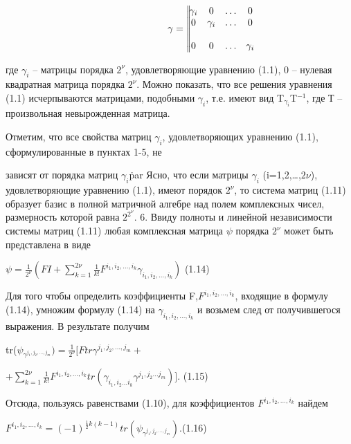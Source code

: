 \documentclass{article}
\begin{document}
{\begin{center}
$$
\gamma=\begin{vmatrix}
\gamma_i & 0 &\ldots & 0\\
0 & \gamma_i &\ldots & 0\\
\hdotsfor{5}\\
0 & 0 &\ldots &\gamma_i
\end{vmatrix}
$$
\end{center}\par
где $\gamma_i$ -- матрицы порядка $2^{\nu}$, удовлетворяющие уравнению (1.1), 0 -- нулевая квадратная матрица порядка $2^{\nu}$. Можно показать, что все решения уравнения (1.1) исчерпываются матрицами, подобными $\gamma_i$, т.е. имеют вид T$_{\gamma_i}$T$^{-1}$, где Т -- произвольная невырожденная матрица.\par
Отметим, что все свойства матриц $\gamma_i$, удовлетворяющих уравнению (1.1), сформулированные в пунктах 1-5, не\par
зависят от порядка матриц $\gamma_i$\.par
Ясно, что если матрицы $\gamma_i$ (i=1,2,\dots ,$2\nu$), удовлетворяющие уравнению (1.1), имеют порядок $2^\nu$, то система матриц (1.11) образует базис в полной матричной алгебре над полем комплексных чисел, размерность которой равна $2^{2^\nu}$.
6. Ввиду полноты и линейной независимости системы матриц (1.11) любая комплексная матрица $\psi$ порядка $2^\nu$ может быть представлена в виде
\begin{center}
$\psi = \frac{1}{2^\nu}(FI+\sum_{k=1}^{2\nu}\frac{1}{k!}F^{i_1,i_2,\dots,i_k}\gamma_{i_1,i_2,\dots,i_k})$   (1.14)\par
\end{center}
Для того чтобы определить коэффициенты F,$F^{i_1,i_2,\dots,i_k}$, входящие в формулу (1.14), умножим формулу (1.14) на $\gamma_{i_1,i_2,\dots,i_k}$ и возьмем след от получившегося выражения. В результате получим\par
tr($\psi_{\gamma^{j_1,j_2,\dots,j_m}})=\frac{1}{2^\nu}[Ftr\gamma^{j_1,j_2,\dots,j_m}+$\par
\begin{center}
+$\sum_{k=1}^{2\nu}\frac{1}{k!}F^{i_1,i_2,\dots,i_k}tr(\gamma_{i_1,i_2\dots i_k}\gamma^{j_1,j_2\dots j_m})]$.   (1.15)
\end{center}\par
Отсюда, пользуясь равенствами (1.10), для коэффициентов $F^{i_1,i_2,\dots,i_k}$ найдем\par
\begin{center}
$F^{i_1,i_2,\dots,i_k}=(-1)^{\frac{1}{2}k(k-1)}tr(\psi_{\gamma^{j_1,j_2,\dots,j_m}}).$(1.16)\par

\end{center}}
\end{document}
